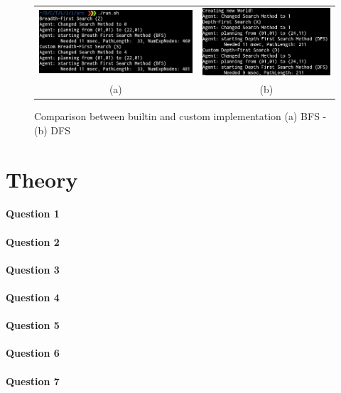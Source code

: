 \begin{figure}[h]
    \centering
    \begin{tabular}{cc}
      \includegraphics[width=.44\linewidth,scale=1]{./images/lab2_bfs.png} & \includegraphics[width=.36\linewidth, scale=1.5]{./images/lab2_dfs.png} \\
      \hspace{0.5cm} (a) & \hspace{0.5cm} (b)
    \end{tabular}
    \caption{Comparison between builtin and custom implementation (a) BFS - (b) DFS \label{fig:BFS and DFS}}
\end{figure}


\newpage
\thispagestyle{empty}
\section{Theory}

\paragraph{Question 1}
\paragraph{Question 2}
\paragraph{Question 3}
\paragraph{Question 4}
\paragraph{Question 5}
\paragraph{Question 6}
\paragraph{Question 7}
